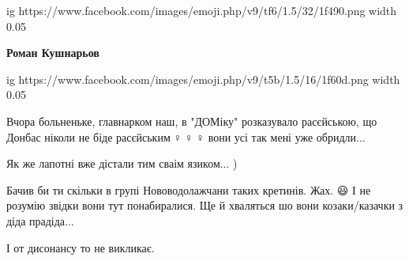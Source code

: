 \begin{itemize}
\begin{itemize}
\ifcmt
  ig https://www.facebook.com/images/emoji.php/v9/tf6/1.5/32/1f490.png
  width 0.05
\fi

 
\textbf{Роман Кушнарьов} 

\ifcmt
  ig https://www.facebook.com/images/emoji.php/v9/t5b/1.5/16/1f60d.png
  width 0.05
\fi

\end{itemize}

 

Вчора больненьке, главнарком наш, в "ДОМіку" розказувало расєйською, що Донбас
ніколи не біде расєйським🤷♀️🤷♀️🤷♀️ вони усі так мені уже
обридли...


 
Як же лапотні вже дістали тим сваім язиком... )

 

Бачив би ти скільки в групі Нововодолажчани таких кретинів. Жах. 😃 І не
розумію звідки вони тут понабиралися. Ще й хваляться шо вони козаки/казачки з
діда прадіда... 🤦

\begin{itemize}
 
І от дисонансу то не викликає.

 

\end{itemize}
\end{itemize}
